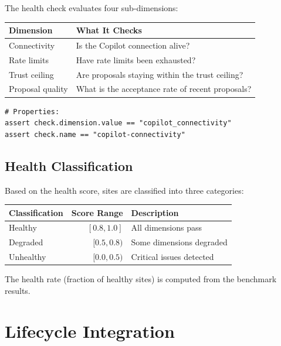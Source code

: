 \documentclass[11pt]{article}
\begin{document}
The health check evaluates four sub-dimensions:

\begin{center}
\begin{tabular}{lp{7cm}}
\toprule
\textbf{Dimension} & \textbf{What It Checks} \\
\midrule
Connectivity     & Is the Copilot connection alive? \\
Rate limits      & Have rate limits been exhausted? \\
Trust ceiling    & Are proposals staying within the trust ceiling? \\
Proposal quality & What is the acceptance rate of recent proposals? \\
\bottomrule
\end{tabular}
\end{center}

\begin{lstlisting}[style=jugeo-python]
# Properties:
assert check.dimension.value == "copilot_connectivity"
assert check.name == "copilot-connectivity"
\end{lstlisting}

\subsection{Health Classification}

Based on the health score, sites are classified into three categories:

\begin{center}
\begin{tabular}{lrl}
\toprule
\textbf{Classification} & \textbf{Score Range} & \textbf{Description} \\
\midrule
Healthy   & $[0.8, 1.0]$ & All dimensions pass \\
Degraded  & $[0.5, 0.8)$ & Some dimensions degraded \\
Unhealthy & $[0.0, 0.5)$ & Critical issues detected \\
\bottomrule
\end{tabular}
\end{center}

The health rate (fraction of healthy sites) is computed from the benchmark results.

\section{Lifecycle Integration}\label{sec:lifecycle}
\end{document}
